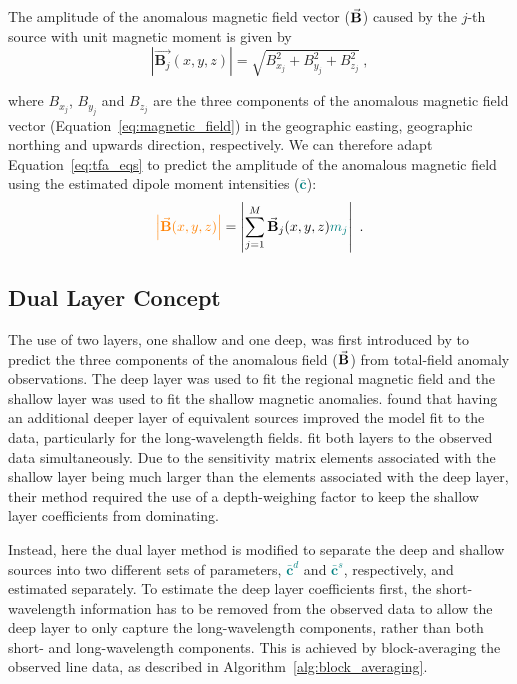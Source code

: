 The amplitude of the anomalous magnetic field vector ($\vec{\mathbf{B}}$) caused by the $j$-th source with unit magnetic moment is given by
\begin{equation}
    \left\lvert \vec{\mathbf{B}_j}(x,y,z) \right\rvert = \sqrt{B^2_{x_j} + B^2_{y_j} +B^2_{z_j}}
    \ ,
\end{equation}

\noindent
where $B_{x_j}$, $B_{y_j}$ and $B_{z_j}$ are the three components of the anomalous magnetic field vector (Equation~\ref{eq:magnetic_field}) in the geographic easting, geographic northing and upwards direction, respectively. We can therefore adapt Equation~\ref{eq:tfa_eqs} to predict the amplitude of the anomalous magnetic field using the estimated dipole moment intensities (\textcolor{teal}{$\bar{\mathbf{c}}$}):
\begin{equation}
\textcolor{orange}{\left\lvert \vec{\mathbf{B}}(x,y,z) \right\rvert} = \left\lvert \sum_{j=1}^{M} \vec{\mathbf{B}}_{j}(x,y,z) \textcolor{teal}{m_j} \right\rvert
\ .
\end{equation}


\subsection{Dual Layer Concept}

The use of two layers, one shallow and one deep, was first introduced by \citet{Li2020} to predict the three components of the anomalous field ($\vec{\mathbf{B}}$) from total-field anomaly observations. The deep layer was used to fit the regional magnetic field and the shallow layer was used to fit the shallow magnetic anomalies. \citet{Li2020} found that having an additional deeper layer of equivalent sources improved the model fit to the data, particularly for the long‐wavelength fields. \citet{Li2020} fit both layers to the observed data simultaneously. Due to the sensitivity matrix elements associated with the shallow layer being much larger than the elements associated with the deep layer, their method required the use of a depth-weighing factor to keep the shallow layer coefficients from dominating.

Instead, here the dual layer method is modified to separate the deep and shallow sources into two different sets of parameters, \textcolor{teal}{$\bar{\mathbf{c}}^d$} and \textcolor{teal}{$\bar{\mathbf{c}}^s$}, respectively, and estimated separately. To estimate the deep layer coefficients first, the short-wavelength information has to be removed from the observed data to allow the deep layer to only capture the long-wavelength components, rather than both short- and long-wavelength components. This is achieved by block-averaging the observed line data, as described in Algorithm~\ref{alg:block_averaging}.


